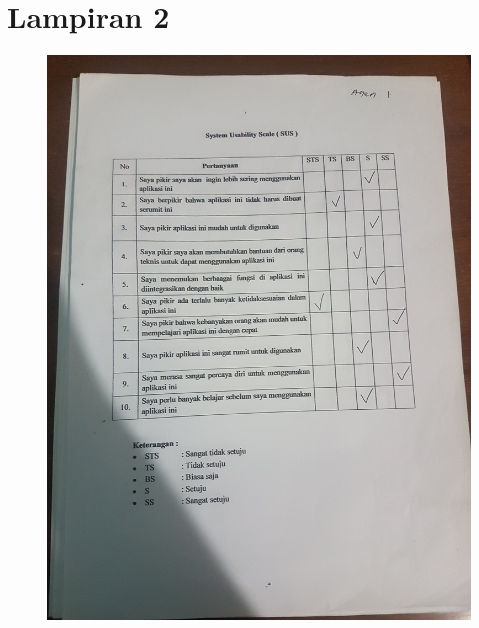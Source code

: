 \chapter*{Lampiran 2}
\begin{figure}[H]
	\center
	\includegraphics [width = 17cm,angle=-90]{gambar/pengujian/agen1}
\end{figure}

